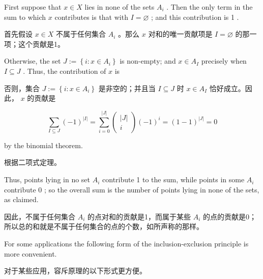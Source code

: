 \documentclass[10pt]{article}
\begin{document}
First suppose that \(x \in  X\) lies in none of the sets \({A}_{i}\) . Then the only term in the sum to which \(x\) contributes is that with \(I = \varnothing\) ; and this contribution is 1 .

\begin{tcolorbox}\relax
首先假设 \(x \in  X\) 不属于任何集合 \({A}_{i}\) 。那么 \(x\) 对和的唯一贡献项是 \(I = \varnothing\) 的那一项；这个贡献是1。
\end{tcolorbox}

Otherwise, the set \(J \mathrel{\text{ := }} \left\{  {i : x \in  {A}_{i}}\right\}\) is non-empty; and \(x \in  {A}_{I}\) precisely when \(I \subseteq  J\) . Thus, the contribution of \(x\) is

\begin{tcolorbox}\relax
否则，集合 \(J \mathrel{\text{ := }} \left\{  {i : x \in  {A}_{i}}\right\}\) 是非空的；并且当 \(I \subseteq  J\) 时 \(x \in  {A}_{I}\) 恰好成立。因此， \(x\) 的贡献是
\end{tcolorbox}

\[
\mathop{\sum }\limits_{{I \subseteq  J}}{\left( -1\right) }^{\left| I\right| } = \mathop{\sum }\limits_{{i = 0}}^{\left| J\right| }\left( \begin{matrix} \left| J\right| \\  i \end{matrix}\right) {\left( -1\right) }^{i} = {\left( 1 - 1\right) }^{\left| J\right| } = 0
\]

by the binomial theorem.

\begin{tcolorbox}\relax
根据二项式定理。
\end{tcolorbox}

Thus, points lying in no set \({A}_{i}\) contribute 1 to the sum, while points in some \({A}_{i}\) contribute 0 ; so the overall sum is the number of points lying in none of the sets, as claimed.

\begin{tcolorbox}\relax
因此，不属于任何集合 \({A}_{i}\) 的点对和的贡献是1，而属于某些 \({A}_{i}\) 的点的贡献是0；所以总的和就是不属于任何集合的点的个数，如所声称的那样。
\end{tcolorbox}

For some applications the following form of the inclusion-exclusion principle is more convenient.

\begin{tcolorbox}\relax
对于某些应用，容斥原理的以下形式更方便。
\end{tcolorbox}
\end{document}

